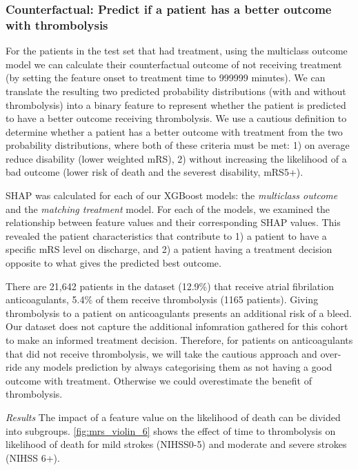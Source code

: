 \subsubsection{Counterfactual: Predict if a patient has a better outcome with thrombolysis}
For the patients in the test set that had treatment, using the {multiclass outcome} model we can calculate their counterfactual outcome of not receiving treatment (by setting the feature onset to treatment time to 999999 minutes). We can translate the resulting two predicted probability distributions (with and without thrombolysis) into a binary feature to represent whether the patient is predicted to have a better outcome receiving thrombolysis. We use a cautious definition to determine whether a patient has a better outcome with treatment from the two probability distributions, where both of these criteria must be met: 1) on average reduce disability (lower weighted mRS), 2) without increasing the likelihood of a bad outcome (lower risk of death and the severest disability, mRS5+).


 SHAP was calculated for each of our XGBoost models: the \textit{multiclass outcome} and the \textit{matching treatment} model. For each of the models, we examined the relationship between feature values and their corresponding SHAP values. This revealed the patient characteristics that contribute to 1) a patient to have a specific mRS level on discharge, and 2) a patient having a treatment decision opposite to what gives the predicted best outcome.



 There are 21,642 patients in the dataset (12.9\%) that receive atrial fibrilation anticoagulants, 5.4\% of them receive thrombolysis (1165 patients). Giving thrombolysis to a patient on anticoagulants presents an additional risk of a bleed. Our dataset does not capture the additional infomration gathered for this cohort to make an informed treatment decision. Therefore, for patients on anticoagulants that did not receive thrombolysis, we will take the cautious approach and over-ride any models prediction by always categorising them as not having a good outcome with treatment. Otherwise we could overestimate the benefit of thrombolysis.



 
\emph{Results}
The impact of a feature value on the likelihood of death can be divided into subgroups. \ref{fig:mrs_violin_6} shows the effect of time to thrombolysis on likelihood of death for mild strokes (NIHSS0-5) and moderate and severe strokes (NIHSS 6+).


